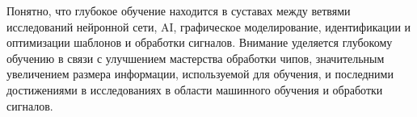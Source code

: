 \begin{frame}

    Понятно, что глубокое обучение находится в суставах между ветвями исследований нейронной сети, AI,
    графическое моделирование, идентификации и оптимизации шаблонов и обработки сигналов.
    Внимание уделяется глубокому обучению в связи с улучшением мастерства обработки чипов,
    значительным увеличением размера информации, используемой для обучения,
    и последними достижениями в исследованиях в области машинного обучения и обработки сигналов.

\end{frame}
